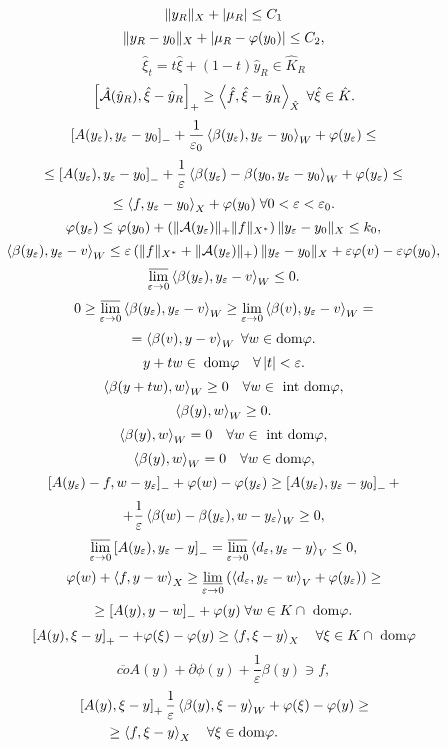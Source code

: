 \documentclass[12pt]{book} %
\let\epsilon\varepsilon
\begin{document}
\[\|y_R\|_X+\left|\mu_R\right|\leq C_1\]
\[\|y_R-y_0\|_X+\left|\mu_R-\varphi(y_0)\right|\leq C_2,\]
\[\hat{\xi}_t=t\hat{\xi}+(1-t)\hat{y}_R\in\hat{K}_R\]
\[\left[\hat{\mathcal{A}}(\hat{y}_R),\hat{\xi}-\hat{y}_R\right]_+\geq\left<\hat{f},\hat{\xi}-\hat{y}_R\right>_{\hat{X}}\;\forall\hat{\xi}\in\hat{K}.\]
\[\mysbra{A(y_\epsilon),y_\epsilon-y_0}_-+\frac{1}{\epsilon_0}\mysca{\beta(y_\epsilon)}{y_\epsilon-y_0}_W+\phi(y_\epsilon)\leq\]
\[\leq\mysbra{A(y_\epsilon),y_\epsilon-y_0}_-+\frac{1}{\epsilon}\mysca{\beta(y_\epsilon)-\beta(y_0}{y_\epsilon-y_0}_W+\phi(y_\epsilon)\leq\]
\[\leq\mysca{f}{y_\epsilon-y_0}_X+\phi(y_0)\;\forall0<\epsilon<\epsilon_0.\]
\[\phi(y_\epsilon)\leq\phi(y_0)+\mybra{\mynorm{\mathcal{A}(y_\epsilon)}_+\mynorm{f}_{X^*}}\mynorm{y_\epsilon-y_0}_{X}\leq k_0,\]
\[\mysca{\beta(y_\epsilon)}{y_\epsilon-v}_W\leq\epsilon\mybra{\mynorm{f}_{X^*}+\mynorm{\mathcal{A}(y_\epsilon)}_+}\mynorm{y_\epsilon-y_0}_X+\epsilon
\phi(v)-\epsilon\phi(y_0),\]
\[\varlimsup_{\epsilon\to0}\mysca{\beta(y_\epsilon)}{y_\epsilon-v}_W\leq0.\]
\[0\geq\varlimsup_{\epsilon\to0}\mysca{\beta(y_\epsilon)}{y_\epsilon-v}_W\geq\lim_{\epsilon\to0}\mysca{\beta(v)}{y_\epsilon-v}_W=\]
\[=\left<\beta(v),y-v\right>_W\;\forall w\in\mbox{dom}\varphi.\]
\[y+tw\in\;\mbox{dom}\phi\quad\forall\myabs{t}<\epsilon.\]
\[\left<\beta(y+tw),w\right>_W\geq0\quad\forall w\in\mbox{ int dom}\varphi,\]
\[\left<\beta(y),w\right>_W\geq0.\]
\[\left<\beta(y),w\right>_W=0\quad\forall w\in\mbox{ int dom}\varphi,\]
\[\left<\beta(y),w\right>_W=0\quad\forall w\in\mbox{dom}\varphi,\]
\[\mysbra{A(y_\epsilon)-f,w-y_\epsilon}_-+\phi(w)-\phi(y_\epsilon)\geq\mysbra{A(y_\epsilon),y_\epsilon-y_0}_-+\]
\[+\frac{1}{\epsilon}\mysca{\beta(w)-\beta(y_\epsilon)}{w-y_\epsilon}_W\geq0,\]
\[\varlimsup_{\epsilon\to0}\mysbra{A(y_\epsilon),y_\epsilon-y}_-=\varlimsup_{\epsilon\to0}\mysca{d_\epsilon}{y_\epsilon-y}_V\leq0,\]
\[\phi(w)+\mysca{f}{y-w}_X\geq\varliminf_{\epsilon\to0}\mybra{\mysca{d_\epsilon}{y_\epsilon-w}_V+\phi(y_\epsilon)}\geq\]
\[\geq\left[A(y),y-w\right]_-+\varphi(y)\;\forall w\in K\cap\mbox{ dom}\varphi.\]
\begin{equation}\left[A(y),\xi-y\right]_+-+\varphi(\xi)-\varphi(y)\geq\left<f,\xi-y\right>_X\quad\forall \xi\in K\cap\mbox{ dom}\varphi\end{equation}
\begin{equation}\overline{co}A(y)+\partial\phi(y)+\frac{1}{\epsilon}\beta(y)\ni f,\end{equation}
\begin{equation}\begin{aligned}
	&\mysbra{A(y),\xi-y}_+\frac{1}{\epsilon}\mysca{\beta(y)}{\xi-y}_W+\phi(\xi)-\phi(y)\geq\\
	&\qquad\geq\mysca{f}{\xi-y}_X\quad\forall\xi\in\mbox{dom}\phi.
\end{aligned}\end{equation}
\end{document}
